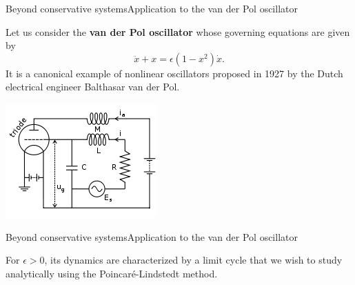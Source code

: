 \documentclass[usenames,dvipsnames,svgnames,10pt,aspectratio=169]{beamer}
\begin{document}
\begin{frame}[t, c]{Beyond conservative systems}{Application to the van der Pol oscillator}
  \begin{minipage}{.58\textwidth}
    Let us consider the \alert{\textbf{van der Pol oscillator}} whose governing equations are given by
    \[
    \ddot{x} + x = \epsilon \left( 1 - x^2 \right) \dot{x}.
    \]
    It is a canonical example of nonlinear oscillators proposed in 1927 by the Dutch electrical engineer Balthasar van der Pol.
  \end{minipage}%
  \hfill
  \begin{minipage}{.38\textwidth}
    \centering
    \includegraphics[width=\textwidth]{van_der_pol}
  \end{minipage}

  \vspace{1cm}
\end{frame}

\begin{frame}[t, c]{Beyond conservative systems}{Application to the van der Pol oscillator}
  \begin{minipage}{.58\textwidth}
    For $\epsilon > 0$, its dynamics are characterized by a limit cycle that we wish to study analytically using the Poincaré-Lindstedt method.
  \end{minipage}%
  \hfill
  \begin{minipage}{.38\textwidth}
    \centering
  \end{minipage}

  \vspace{1cm}
\end{frame}
\end{document}
